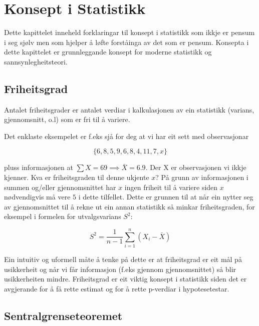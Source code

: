 \chapter{Konsept i Statistikk}

Dette kapittelet inneheld forklaringar til konsept i statistikk som ikkje er pensum i seg sjølv men som hjelper å løfte forståinga av det som er pensum. Konsepta i dette kapittelet er grunnleggande konsept for moderne statistikk og sannsynlegheitsteori.

\section{Friheitsgrad}\label{chap:friheitsgrad}
Antalet friheitsgrader er antalet verdiar i kalkulasjonen av ein statistikk (varians, gjennomsnitt, o.l) som er fri til å variere.

Det enklaste eksempelet er f.eks sjå for deg at vi har eit sett med observasjonar 

\begin{equation*}
    \{ 6, 8, 5, 9, 6, 8, 4, 11, 7, x \}
\end{equation*}

pluss informasjonen at $\sum X = 69 \implies \bar{X}=6.9$. Der X er observasjonen vi ikkje kjenner. Kva er friheitsgraden til denne ukjente $x$? På grunn av informasjonen i summen og/eller gjennomsnittet har $x$ ingen friheit til å variere siden $x$ nødvendigvis må vere $5$ i dette tilfellet. Dette er grunnen til at når ein nytter seg av gjennomsnittet til å rekne ut ein annan statistikk så minkar friheitsgraden, for eksempel i formelen for utvalgsvarians $S^2$:

\begin{equation*}
    S^2 = \frac{1}{n - 1} \sum_{i=1}^{n}(X_i - \bar{X})
\end{equation*}

Ein intuitiv og uformell måte å tenke på dette er at friheitsgrad er eit mål på usikkerheit og når vi får informasjon (f.eks gjennom gjennomsnittet) så blir usikkerheiten mindre. Friheitsgrad er eit viktig konsept i statistikk siden det er avgjerande for å få rette estimat og for å rette p-verdiar i hypotesetestar.

\section{Sentralgrenseteoremet}\label{chap:sentralgrense}